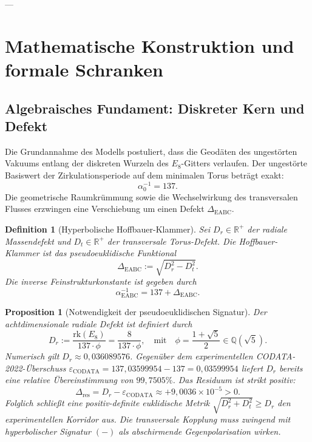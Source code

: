 \documentclass[11pt,a4paper]{article}
\newtheorem{definition}[theorem]{Definition}
\newtheorem{proposition}[theorem]{Proposition}
\begin{document}
---

\section{Mathematische Konstruktion und formale Schranken}

\subsection{Algebraisches Fundament: Diskreter Kern und Defekt}
Die Grundannahme des Modells postuliert, dass die Geodäten des ungestörten Vakuums entlang der diskreten Wurzeln des $E_8$-Gitters verlaufen. Der ungestörte Basiswert der Zirkulationsperiode auf dem minimalen Torus beträgt exakt:
\begin{equation}
\alpha_0^{-1} = 137.
\end{equation}
Die geometrische Raumkrümmung sowie die Wechselwirkung des transversalen Flusses erzwingen eine Verschiebung um einen Defekt $\Delta_{\mathrm{EABC}}$.

\begin{definition}[Hyperbolische Hoffbauer-Klammer]
Sei $D_r \in \mathbb{R}^+$ der radiale Massendefekt und $D_t \in \mathbb{R}^+$ der transversale Torus-Defekt. Die Hoffbauer-Klammer ist das pseudoeuklidische Funktional
\begin{equation}
\Delta_{\mathrm{EABC}} := \sqrt{D_r^2 - D_t^2}.
\end{equation}
Die inverse Feinstrukturkonstante ist gegeben durch
\begin{equation}
\alpha^{-1}_{\mathrm{EABC}} = 137 + \Delta_{\mathrm{EABC}}.
\end{equation}
\end{definition}

\begin{proposition}[Notwendigkeit der pseudoeuklidischen Signatur]
Der achtdimensionale radiale Defekt ist definiert durch
\begin{equation}
D_r := \frac{\mathrm{rk}(E_8)}{137 \cdot \phi} = \frac{8}{137 \cdot \phi}, \quad \text{mit} \quad \phi = \frac{1+\sqrt{5}}{2} \in \mathbb{Q}(\sqrt{5}).
\end{equation}
Numerisch gilt $D_r \approx 0{,}036089576$. Gegenüber dem experimentellen CODATA-2022-Überschuss $\varepsilon_{\mathrm{CODATA}} = 137{,}03599954 - 137 = 0{,}03599954$ liefert $D_r$ bereits eine relative Übereinstimmung von $99{,}7505\%$. 
Das Residuum ist strikt positiv:
\begin{equation}
\Delta_{\mathrm{res}} = D_r - \varepsilon_{\mathrm{CODATA}} \approx +9{,}0036 \times 10^{-5} > 0.
\end{equation}
Folglich schließt eine positiv-definite euklidische Metrik $\sqrt{D_r^2 + D_t^2} \ge D_r$ den experimentellen Korridor aus. Die transversale Kopplung muss zwingend mit hyperbolischer Signatur $(-)$ als abschirmende Gegenpolarisation wirken.
\end{proposition}
\end{document}
